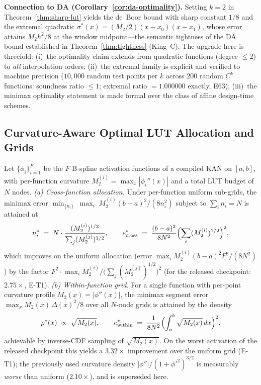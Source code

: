 \vspace{2pt}
\noindent\textbf{Connection to DA (Corollary~\ref{cor:da-optimality}).}
Setting $k = 2$ in Theorem~\ref{thm:sharp-lut} yields the de~Boor bound
with sharp constant $1/8$ and the extremal quadratic
$\sigma^{*}(x) = (M_2/2)(x - x_0)(x - x_1)$, whose error attains
$M_2 h^2/8$ at the window midpoint---the semantic tightness of the DA
bound established in Theorem~\ref{thm:tightness} (King~C). The upgrade
here is threefold: (i)~the optimality claim extends from quadratic
functions (degree-$\leq 2$) to \emph{all} interpolation orders;
(ii)~the extremal family is explicit and verified to machine precision
($10{,}000$ random test points per $k$ across 200 random $C^k$ functions:
soundness ratio $\leq 1$; extremal
ratio $= 1.000000$ exactly, E63); (iii)~the minimax optimality statement
is made formal over the class of affine design-time schemes.

\vspace{4pt}
\subsection{Curvature-Aware Optimal LUT Allocation and Grids}
\label{sec:optimal-lut}

\setcounter{theorem}{12}
\begin{theorem}
\label{thm:optimal_lut}
Let $\{\phi_i\}_{i=1}^{F}$ be the $F$ B-spline activation functions of a
compiled KAN on $[a,b]$, with per-function curvature
$M_2^{(i)} = \max_x |\phi_i''(x)|$ and a total LUT budget of $N$ nodes.
\emph{(a) Cross-function allocation.} Under per-function uniform
sub-grids, the minimax error
$\min_{\{n_i\}}\; \max_i\; M_2^{(i)}(b-a)^2/(8 n_i^2)$ subject to
$\sum_i n_i = N$ is attained at
\begin{equation}
n_i^{*} \;=\; N \cdot \frac{(M_2^{(i)})^{1/2}}{\sum_j (M_2^{(j)})^{1/2}},
\qquad
e^{*}_{\text{cross}} \;=\; \frac{(b-a)^2}{8N^{2}}
\Bigl(\sum_i (M_2^{(i)})^{1/2}\Bigr)^{2},
\label{eq:optimal_cross}
\end{equation}
which improves on the uniform allocation (error
$\max_i M_2^{(i)}(b-a)^2 F^2/(8N^2)$) by the factor
$F^{2} \cdot \max_i M_2^{(i)} / \bigl(\sum_j (M_2^{(j)})^{1/2}\bigr)^{2}$
(for the released checkpoint: $2.75\times$, E-T1).
\emph{(b) Within-function grid.} For a single function with per-point
curvature profile $M_2(x) = |\phi''(x)|$, the minimax segment error
$\max_x M_2(x)\,\Delta(x)^2/8$ over all $N$-node grids is attained by
the density
\begin{equation}
\rho^{*}(x) \;\propto\; \sqrt{M_2(x)},
\qquad
e^{*}_{\text{within}} \;=\; \frac{1}{8N^{2}}\Bigl(\int_a^b
\sqrt{M_2(x)}\,dx\Bigr)^{2},
\label{eq:optimal_density}
\end{equation}
achievable by inverse-CDF sampling of $\sqrt{M_2(x)}$. On the worst
activation of the released checkpoint this yields a $3.32\times$
improvement over the uniform grid (E-T1); the previously used curvature
density $|\phi''|/(1+\phi'^2)^{3/2}$ is measurably \emph{worse} than
uniform ($2.10\times$), and is superseded here.
\end{theorem}

